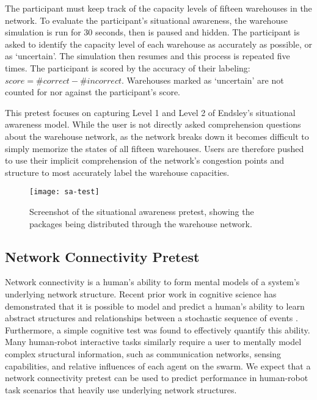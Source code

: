 \documentclass[letterpaper, 10 pt, conference]{ieeeconf}  %
\begin{document}
The participant must keep track of the capacity levels of fifteen warehouses in the network.   To evaluate the participant's situational awareness, the warehouse simulation is run for 30 seconds, then is paused and hidden.  The participant is asked to identify the capacity level of each warehouse as accurately as possible, or as `uncertain'.  The simulation then resumes and this process is repeated five times.  The participant is scored by the accuracy of their labeling: $ score = \# correct - \# incorrect $. Warehouses marked as `uncertain' are not counted for nor against the participant's score.

This pretest focuses on capturing Level 1 and Level 2 of Endsley's situational awareness model. While the user is not directly asked comprehension questions about the warehouse network, as the network breaks down it becomes difficult to simply memorize the states of all fifteen warehouses. Users are therefore pushed to use their implicit comprehension of the network's congestion points and structure to most accurately label the warehouse capacities.

\begin{figure}[h]
  \centering
  \texttt{[image: sa-test]}
  \caption{Screenshot of the situational awareness pretest, showing the packages being distributed through the warehouse network.}
  \label{fig:pretest-SA}
\end{figure}

\subsection{Network Connectivity Pretest}

Network connectivity is a human's ability to form mental models of a system's underlying network structure. Recent prior work in cognitive science has demonstrated that it is possible to model and predict a human’s ability to learn abstract structures and relationships between a stochastic sequence of events \cite{lynn2020abstract}. Furthermore, a simple cognitive test was found to effectively quantify this ability. Many human-robot interactive tasks similarly require a user to mentally model complex structural information, such as communication networks, sensing capabilities, and relative influences of each agent on the swarm. We expect that a network connectivity pretest can be used to predict performance in human-robot task scenarios that heavily use underlying network structures.
\end{document}

